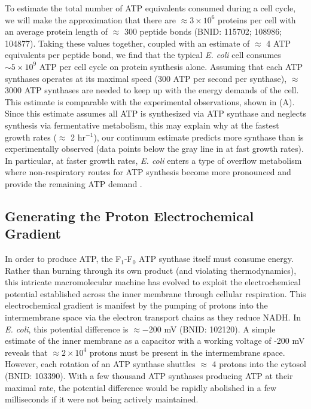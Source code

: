 To estimate the total number of ATP equivalents consumed during a cell cycle, we
will make the approximation that there are $\approx 3\times10^6$ proteins per
cell with an average protein length of $\approx$ 300 peptide bonds (BNID:
115702; 108986; 104877). Taking these values together, coupled with an estimate
of $\approx$ 4 ATP equivalents per peptide bond, we find that the typical
\textit{E. coli} cell consumes $\sim 5 \times 10^9$ ATP per cell cycle on
protein synthesis alone. Assuming that each ATP synthases operates at its
maximal speed (300 ATP per second per synthase), $\approx$ 3000 ATP synthases
are needed to keep up with the energy demands of the cell. This estimate
is comparable with the experimental observations,  shown in
 (A). Since this estimate assumes all ATP is
synthesized via ATP synthase and neglects synthesis via fermentative metabolism,
this may explain why at the fastest growth rates ($\approx$ 2
hr$^{-1}$), our continuum estimate predicts more synthase than is experimentally
observed (data points below the gray line in  at fast growth rates). In particular, at faster growth rates,
\textit{E. coli} enters a type of overflow metabolism where non-respiratory
routes for ATP synthesis become more pronounced and provide the remaining ATP demand \citep{molenaar2009, zhuang2011, szenk2017} .

\subsection{Generating the Proton Electrochemical Gradient}
In order to produce ATP, the F$_1$-F$_0$ ATP synthase itself must consume
energy. Rather than burning through its own product (and violating
thermodynamics), this intricate macromolecular machine has evolved to exploit
the electrochemical potential established across the inner membrane through
cellular respiration. This electrochemical gradient is manifest by the pumping
of protons into the intermembrane space via the electron transport chains as
they reduce NADH. In \textit{E. coli}, this potential difference is $\approx
-$200 mV (BNID: 102120). A simple estimate of the inner membrane as a capacitor
with a working voltage of -200 mV reveals that $\approx 2\times 10^4$ protons
must be present in the intermembrane space. However, each rotation of an ATP
synthase shuttles $\approx$ 4 protons into the cytosol (BNID: 103390). With a few thousand ATP
synthases producing ATP at their maximal rate, the potential difference would be
rapidly abolished in a few milliseconds if it were not being actively
maintained.

